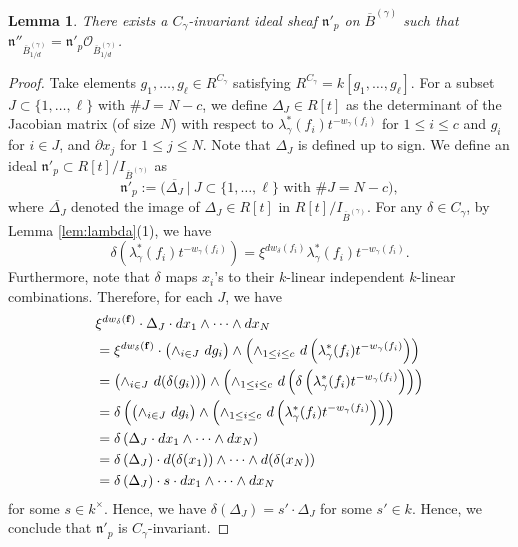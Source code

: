 \documentclass[a4paper,11pt]{amsart}
\newtheorem{lem}[thm]{Lemma}
\theoremstyle{definition}
\theoremstyle{remark}
\begin{document}
\begin{lem}\label{lem:L4}
There exists a $C_{\gamma}$-invariant ideal sheaf $\mathfrak{n}'_{p}$ on $\overline{B}^{(\gamma)}$ such that 
$\mathfrak{n}''_{\overline{B}^{(\gamma)}_{1/d}} = \mathfrak{n}'_{p} \mathcal{O}_{\overline{B}^{(\gamma)}_{1/d}}$. 
\end{lem}
\begin{proof}
Take elements $g_1, \ldots , g_{\ell} \in R^{C_{\gamma}}$ satisfying $R^{C_{\gamma}} = k[g_1, \ldots, g_{\ell}]$. 
For a subset $J \subset \{ 1, \ldots, \ell \}$ with $\# J = N-c$, we define $\Delta _J \in R[t]$ as the determinant of the Jacobian matrix (of size $N$) with respect to $\lambda ^* _{\gamma} (f_i) t^{- w_{\gamma}(f_i)}$ for $1 \le i \le c$ and $g_i$ for $i \in J$, and $\partial x_j$ for $1 \le j \le N$. 
Note that $\Delta _J$ is defined up to sign.
We define an ideal $\mathfrak{n}'_{p} \subset R[t] / I_{\overline{B}^{(\gamma)}}$ as 
\[
\mathfrak{n}'_{p} := \bigl ( \overline{ \Delta _J} \ \big| \ \text{$J \subset \{ 1, \ldots, \ell \}$ with $\# J = N-c$} \bigr ), 
\]
where $\overline{ \Delta _J}$ denoted the image of $\Delta _J \in R[t]$ in $R[t] / I_{\overline{B}^{(\gamma)}}$. 
For any $\delta \in C_{\gamma}$, by Lemma \ref{lem:lambda}(1), we have 
\[
\delta \left( \lambda ^* _{\gamma} (f_i) t^{- w_{\gamma}(f_i)} \right) 
= 
\xi^{d w_{\delta} (f_i)} \lambda ^* _{\gamma} (f_i) t^{- w_{\gamma}(f_i)}. 
\]
Furthermore, note that $\delta$ maps $x_i$'s to their $k$-linear independent $k$-linear combinations. 
Therefore, for each $J$, we have 
\begin{align*}
&
\xi^{d w_{\delta} ({\bf f})} \cdot \Delta _J \cdot dx_1 \wedge \cdots \wedge dx_N \\
&=
\xi^{d w_{\delta} ({\bf f})} \cdot 
\bigl( \wedge_{i \in J} \ d g_i \bigr) 
\wedge 
\left( \wedge _{1 \le i \le c}\ d \left( \lambda ^* _{\gamma} (f_i) t^{- w_{\gamma}(f_i)} \right) \right) \\
&=
\bigl( \wedge_{i \in J}\ d (\delta (g_i)) \bigr) 
\wedge 
\left( \wedge _{1 \le i \le c} \ d \left( \delta \left( \lambda ^* _{\gamma} (f_i) t^{- w_{\gamma}(f_i)} \right) \right) \right) \\
&=
\delta \left( 
\bigl( \wedge_{i \in J}\ d g_i \bigr) 
\wedge 
\left( \wedge _{1 \le i \le c} \ d \left( \lambda ^* _{\gamma} (f_i) t^{- w_{\gamma}(f_i)} \right) \right)
\right)\\
&=
\delta \left(
\Delta _J \cdot dx_1 \wedge \cdots \wedge dx_N
\right) \\
&=
\delta \left( \Delta _J \right) 
\cdot d (\delta (x_1)) \wedge \cdots \wedge d (\delta (x_N)) \\
&= 
\delta \left( \Delta _J \right) \cdot s \cdot dx_1 \wedge \cdots \wedge dx_N 
\end{align*}
for some $s \in k^{\times}$. 
Hence, we have $\delta (\Delta _J) = s' \cdot \Delta _J$ for some $s' \in k$. 
Hence, we conclude that $\mathfrak{n}'_{p}$ is $C_{\gamma}$-invariant. 


\end{proof}
\end{document}
